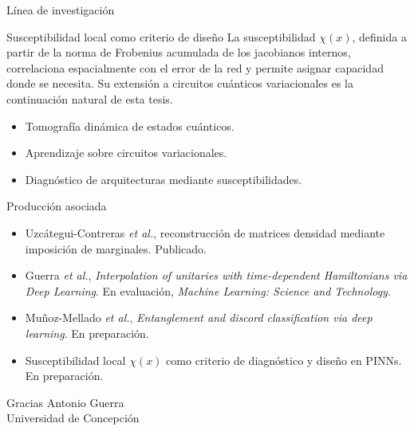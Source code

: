 \documentclass[10pt,aspectratio=169]{beamer}
\begin{document}
\begin{frame}{Línea de investigación}
  \begin{block}{Susceptibilidad local como criterio de diseño}
    La susceptibilidad $\chi(x)$, definida a partir de la norma de Frobenius acumulada de los jacobianos internos, correlaciona espacialmente con el error de la red y permite asignar capacidad donde se necesita. Su extensión a circuitos cuánticos variacionales es la continuación natural de esta tesis.
  \end{block}
  \pause
  \vfill
  \begin{itemize}
    \item Tomografía dinámica de estados cuánticos.
    \item Aprendizaje sobre circuitos variacionales.
    \item Diagnóstico de arquitecturas mediante susceptibilidades.
  \end{itemize}
\end{frame}

\begin{frame}{Producción asociada}
  \begin{itemize}
    \item Uzcátegui-Contreras \emph{et al.}, reconstrucción de matrices densidad mediante imposición de marginales. Publicado.
    \item Guerra \emph{et al.}, \textit{Interpolation of unitaries with time-dependent Hamiltonians via Deep Learning}. En evaluación, \emph{Machine Learning: Science and Technology}.
    \item Muñoz-Mellado \emph{et al.}, \textit{Entanglement and discord classification via deep learning}. En preparación.
    \item Susceptibilidad local $\chi(x)$ como criterio de diagnóstico y diseño en PINNs. En preparación.
  \end{itemize}
\end{frame}

\begin{frame}[plain]
  \begin{center}
    \Large Gracias
    \vfill
    \normalsize
    Antonio Guerra \\
    Universidad de Concepción
  \end{center}
\end{frame}

\end{document}
